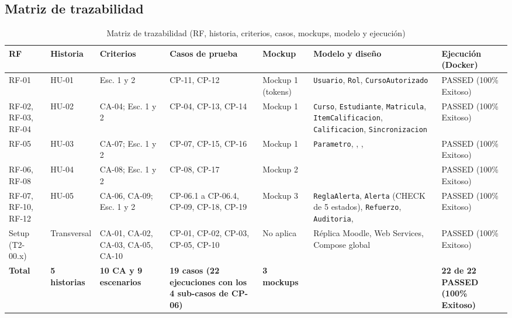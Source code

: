 \documentclass[11pt,a4paper]{article}
\newcommand{\hd}[1]{\textbf{#1}}
\begin{document}
\subsection{Matriz de trazabilidad}
\begin{table}[H]
\centering\small
\caption{Matriz de trazabilidad (RF, historia, criterios, casos, mockups, modelo y ejecución)}
\begin{tabularx}{\textwidth}{|R{1.7cm}|R{1.1cm}|R{1.9cm}|R{2.2cm}|R{1.5cm}|Y|R{1.8cm}|}
\hline
\hd{RF} & \hd{Historia} & \hd{Criterios} & \hd{Casos de prueba} & \hd{Mockup} & \hd{Modelo y diseño} & \hd{Ejecución (Docker)}\\ \hline
RF-01 & HU-01 & Esc. 1 y 2 & CP-11, CP-12 & Mockup 1 (tokens) & \texttt{Usuario}, \texttt{Rol}, \texttt{CursoAutorizado} & PASSED (100\% Exitoso)\\ \hline
RF-02, RF-03, RF-04 & HU-02 & CA-04; Esc. 1 y 2 & CP-04, CP-13, CP-14 & Mockup 1 & \texttt{Curso}, \texttt{Estudiante}, \texttt{Matricula}, \texttt{ItemCalificacion}, \texttt{Calificacion}, \texttt{Sincronizacion} & PASSED (100\% Exitoso)\\ \hline
RF-05 & HU-03 & CA-07; Esc. 1 y 2 & CP-07, CP-15, CP-16 & Mockup 1 & \texttt{Parametro}, , ,  & PASSED (100\% Exitoso)\\ \hline
RF-06, RF-08 & HU-04 & CA-08; Esc. 1 y 2 & CP-08, CP-17 & Mockup 2 &  & PASSED (100\% Exitoso)\\ \hline
RF-07, RF-10, RF-12 & HU-05 & CA-06, CA-09; Esc. 1 y 2 & CP-06.1 a CP-06.4, CP-09, CP-18, CP-19 & Mockup 3 & \texttt{ReglaAlerta}, \texttt{Alerta} (CHECK de 5 estados), \texttt{Refuerzo}, \texttt{Auditoria},  & PASSED (100\% Exitoso)\\ \hline
Setup (T2-00.x) & Transversal & CA-01, CA-02, CA-03, CA-05, CA-10 & CP-01, CP-02, CP-03, CP-05, CP-10 & No aplica & Réplica Moodle, Web Services, Compose global & PASSED (100\% Exitoso)\\ \hline
\textbf{Total} & \textbf{5 historias} & \textbf{10 CA y 9 escenarios} & \textbf{19 casos (22 ejecuciones con los 4 sub-casos de CP-06)} & \textbf{3 mockups} & & \textbf{22 de 22 PASSED (100\% Exitoso)}\\ \hline
\end{tabularx}
\end{table}

\end{document}

